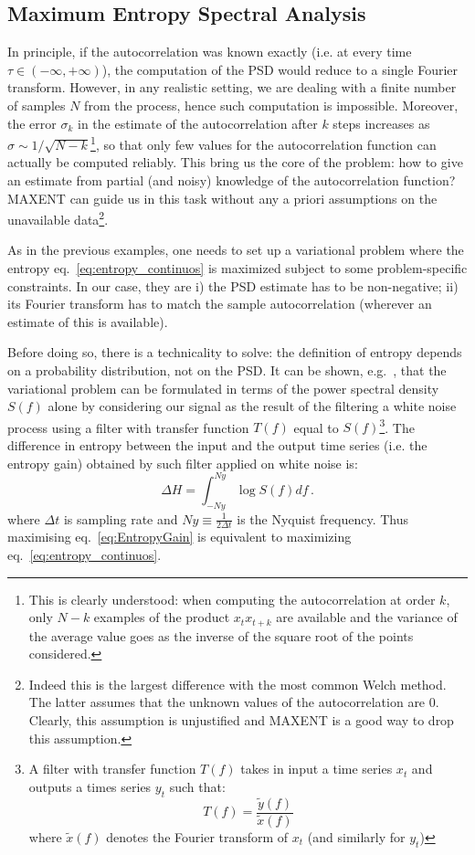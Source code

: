 \documentclass[twocolumn,showpacs,preprintnumbers,nofootinbib,prd,
superscriptaddress,10pt]{revtex4-1}
\begin{document}
\subsection{Maximum Entropy Spectral Analysis} \label{sec:MESA}

In principle, if the autocorrelation was known exactly (i.e. at every time $\tau \in (-\infty,+\infty)$), the computation of the PSD 
would reduce to a single Fourier transform.
However, in any realistic setting, we are dealing with a finite number of samples $N$ from the process, hence such computation
is impossible.
Moreover, the error $\sigma_k$ in the estimate of the autocorrelation after $k$ steps increases as $\sigma \sim 1/\sqrt{N - k}$\footnote{
This is clearly understood: when computing the autocorrelation at order $k$, only $N-k$ examples of the product $x_t x_{t+k}$ are available and the variance of the average value goes as the inverse of the square root of the points considered.
}, so that only few values for the autocorrelation function can actually be computed reliably.
This bring us the core of the problem: how to give an estimate from partial (and noisy) knowledge of the autocorrelation function? MAXENT can guide us in this task without any a priori assumptions on the unavailable data\footnote{Indeed this is the largest difference with the most common Welch method. The latter assumes that the unknown values of the autocorrelation are $0$. Clearly, this assumption is unjustified and MAXENT is a good way to drop this assumption.}.

As in the previous examples, one needs to set up a variational problem where the entropy eq.~\eqref{eq:entropy_continuos} is maximized 
subject to some problem-specific constraints. 
In our case, they are i) the PSD estimate has to be non-negative; ii) its Fourier transform has to match the sample autocorrelation (wherever an estimate of this is available).

Before doing so, there is a technicality to solve: the definition of entropy depends on a probability distribution, not on the PSD.
It can be shown, e.g.~\cite{AblesMESA, Bartlett}, that the variational problem can be formulated in terms of the power spectral density $S(f)$ alone by considering our signal as the result of the filtering a white noise process using a filter with transfer function $T(f)$ equal to $S(f)$\footnote{
A filter with transfer function $T(f)$ takes in input a time series $x_t$ and outputs a times series $y_t$ such that:
$$T(f) = \frac{\tilde{y}(f)}{\tilde{x}(f)}$$
where $\tilde{x}(f)$ denotes the Fourier transform of $x_t$ (and similarly for $y_t$)
}.
The difference in entropy between the input and the output time series (i.e. the entropy gain) obtained by such filter applied on white noise is:
\begin{equation}\label{eq:EntropyGain}
    \Delta H = \int_{- Ny}^{Ny}\log S(f) df\,.
\end{equation}
where $\Delta t$ is sampling rate and $Ny \equiv \frac{1}{2 \Delta t}$  is the Nyquist frequency.
Thus maximising eq.~\eqref{eq:EntropyGain} is equivalent to maximizing eq.~\eqref{eq:entropy_continuos}.
\end{document}
